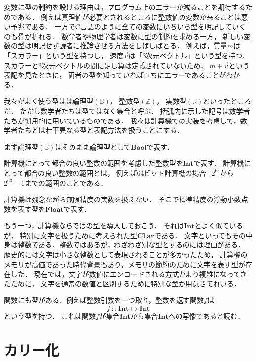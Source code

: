 \documentclass[a5paper,draft]{jsbook}
\newcommand{\programminglanguage}[1]{\textsf{#1}}
\newcommand{\clang}{\programminglanguage{C}}
\newcommand{\mathSpecialSet}[1]{\mathbb{#1}} %
\newcommand{\mathTypeName}[1]{\textbf{#1}}
\newcommand{\mathVectorVar}[1]{\vec{#1}}
\newcommand{\mathBinaryOperator}[1]{\operatorname{#1}}
\newcommand{\mathIn}{\mathBinaryOperator{:\!:}}
\newcommand{\mathMapsTo}{\mapsto}
\newcommand{\mathMorph}[2]{#1\mathMapsTo#2}
\begin{document}
変数に型の制約を設ける理由は，プログラム上のエラーが減ることを期待するためである．
例えば真理値が必要とされるところに整数値の変数が来ることは悪い予兆である．
一方で\clang 言語のように全ての変数にいちいち型を明記していくのも骨が折れる．
数学者や物理学者は変数に型の制約を求める一方，
新しい変数の型は明記せず読者に推論させる方法をしばしばとる．
例えば，質量$m$は「スカラー」という型を持つし，
速度$\mathVectorVar{v}$は「3次元ベクトル」という型を持つ．
スカラーと3次元ベクトルの間に足し算は定義されていないため，
$m+\mathVectorVar{v}$という表記を見たときに，
両者の型を知っていれば直ちにエラーであることがわかる．

我々がよく使う型はは論理型$(\mathSpecialSet{B})$，
整数型$(\mathSpecialSet{Z})$，
実数型$(\mathSpecialSet{R})$といったところだ．
ただし数学者たちは型ではなく集合と呼ぶ．
括弧内に示した記号は数学者たちが慣用的に用いているものである．
我々は計算機での実装を考慮して，数学者たちとは若干異なる型と表記方法を扱うことにする．

まず論理型$(\mathSpecialSet{B})$はそのまま論理型として$\mathTypeName{Bool}$で表す．

計算機にとって都合の良い整数の範囲を考慮した整数型を$\mathTypeName{Int}$で表す．
計算機にとって都合の良い整数の範囲とは，
例えば64ビット計算機の場合$-2^{63}$から$2^{63}-1$までの範囲のことである．

計算機は残念ながら無限精度の実数を扱えない．
そこで標準精度の浮動小数点数を表す型を$\mathTypeName{Float}$で表す．

もう一つ，計算機ならではの型を導入しておこう．
それは$\mathTypeName{Int}$とよく似ているが，
特別に文字を扱うために考えられた型$\mathTypeName{Char}$である．
文字といってもその中身は整数である．整数ではあるが，わざわざ別な型とするのには理由がある．
歴史的には文字は小さな整数として表現されることが多かったため，
計算機のメモリが高価であった時代背景もあり，メモリの節約のために文字を表す型が存在した．
現在では，文字が数値にエンコードされる方式がより複雑になってきたために，
文字を通常の数値と区別するために特別な型が用意さてれいる．

関数にも型がある．例えば整数引数を一つ取り，整数を返す関数$f$は
\begin{equation}
f\mathIn\mathMorph{\mathTypeName{Int}}{\mathTypeName{Int}}
\end{equation}
という型を持つ．
これは関数$f$が集合$\mathTypeName{Int}$から集合$\mathTypeName{Int}$への写像であると読む．

\section{カリー化}
\end{document}
